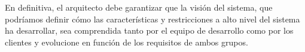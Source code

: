 \documentclass[11pt,a4paper]{article}
\begin{document}
En definitiva, el arquitecto debe garantizar que la visión del sistema, que podríamos definir cómo las características y restricciones a alto nivel del sistema ha desarrollar, sea comprendida tanto por el equipo de desarrollo como por los clientes y evolucione en función de los requisitos de ambos grupos.
\end{document}
